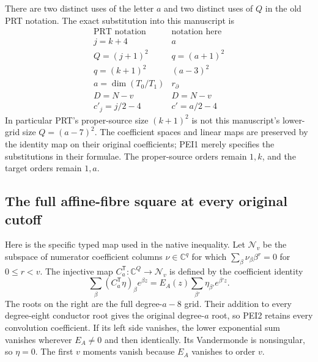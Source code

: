There are two distinct uses of the letter $a$ and two distinct uses of
$Q$ in the old PRT notation. The exact substitution into this manuscript is
\[
 \begin{array}{c|c}
 \text{PRT notation}&\text{notation here}\\ \hline
 j=k+4&a\\
 Q=(j+1)^2&q=(a+1)^2\\
 q=(k+1)^2&(a-3)^2\\
 a=\dim(T_0/T_1)&r_\partial\\
 D=N-v&D=N-v\\
 c'_j=j/2-4&c'=a/2-4
 \end{array}                                                     \tag{PEI1}
\]
In particular PRT's proper-source size $(k+1)^2$ is not this
manuscript's lower-grid size $Q=(a-7)^2$. The coefficient spaces and
linear maps are preserved by the identity map on their original
coefficients; PEI1 merely specifies the substitutions in their formulae.
The proper-source orders remain $1,k$, and the target orders remain $1,a$.

\subsection{The full affine-fibre square at every original cutoff}

Here is the specific typed map used in the native inequality.
Let $\mathscr N_v$ be the subspace of numerator coefficient columns
$\nu\in\mathbb C^q$ for which
$\sum_\beta\nu_\beta\beta^r=0$ for $0\le r<v$.
The injective map $C_a^{\mathsf T}:\mathbb C^Q\to\mathscr N_v$
is defined by the coefficient identity
\[
 \sum_\beta(C_a^{\mathsf T}\eta)_\beta e^{\beta z}
   =E_A(z)\sum_{\beta'}\eta_{\beta'}e^{\beta' z}.
                                                               \tag{PEI2}
\]
The roots on the right are the full degree-$a-8$ grid. Their addition
to every degree-eight conductor root gives the original degree-$a$
root, so PEI2 retains every convolution coefficient. If its left side
vanishes, the lower exponential sum vanishes wherever $E_A\ne0$ and
then identically. Its Vandermonde is nonsingular, so $\eta=0$.
The first $v$ moments vanish because $E_A$ vanishes to order $v$.

